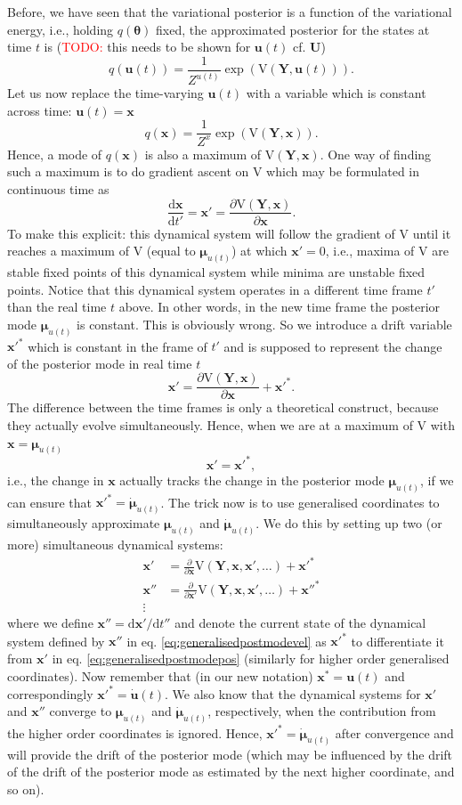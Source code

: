 \documentclass[a4paper,10pt]{article}
\newcommand{\todo}{\textcolor{red}{TODO: }}
\newcommand{\bs}[1]{\mathbf{#1}}					%
\newcommand{\bgs}[1]{\boldsymbol{#1}}				%
\newcommand{\ud}{\mathrm{d}}					%
\newcommand{\pd}[2]{\frac{\partial #1}{\partial #2}} 	%
\newcommand{\eq}[1]{\begin{equation} #1 \end{equation}}%
\renewcommand{\ss}{u}         %
\newcommand{\sh}{x}         %
\newcommand{\spm}{\mu}    %
\renewcommand{\sp}{\theta}    %
\newcommand{\ps}{\bs{\ss}}    %
\newcommand{\ph}{\bs{\sh}}    %
\newcommand{\ppm}{\bgs{\spm}}   %
\newcommand{\pp}{\bgs{\sp}} %
\newcommand{\Ps}{\bs{U}}    %
\newcommand{\Po}{\bs{Y}}    %
\newcommand{\V}{\mathrm{V}}			%
\begin{document}
Before, we have seen that the variational posterior is a function of the variational energy, i.e., holding $q(\pp)$ fixed, the approximated posterior for the states at time $t$ is (\todo this needs to be shown for $\ps(t)$ cf. $\Ps$)
\eq{
    q(\ps(t)) = \frac{1}{Z^{\ss(t)}}\exp\left(\V(\Po,\ps(t)) \right).
}
Let us now replace the time-varying $\ps(t)$ with a variable which is constant across time: $\ps(t)=\ph$
\eq{
    q(\ph) = \frac{1}{Z^{\sh}}\exp\left(\V(\Po,\ph) \right).
}
Hence, a mode of $q(\ph)$ is also a maximum of $\V(\Po,\ph)$. One way of finding such a maximum is to do gradient ascent on $\V$ which may be formulated in continuous time as
\eq{\label{eq:dynGradientAscent}
    \frac{\ud \ph}{\ud t'} = \ph' = \pd{\V(\Po,\ph)}{\ph}.
}
To make this explicit: this dynamical system will follow the gradient of $\V$ until it reaches a maximum of $\V$ (equal to $\ppm_{\ss(t)}$) at which $\ph'=0$, i.e., maxima of $\V$ are stable fixed points of this dynamical system while minima are unstable fixed points. Notice that this dynamical system operates in a different time frame $t'$ than the real time $t$ above. In other words, in the new time frame the posterior mode $\ppm_{\ss(t)}$ is constant. This is obviously wrong. So we introduce a drift variable $\ph'^*$ which is constant in the frame of $t'$ and is supposed to represent the change of the posterior mode in real time $t$
\eq{
    \ph' = \pd{\V(\Po,\ph)}{\ph} + \ph'^*.
}
The difference between the time frames is only a theoretical construct, because they actually evolve simultaneously. Hence, when we are at a maximum of $\V$ with $\ph=\ppm_{\ss(t)}$
\eq{
    \ph' = \ph'^*,
}
i.e., the change in $\ph$ actually tracks the change in the posterior mode $\ppm_{\ss(t)}$, if we can ensure that $\ph'^* = \dot{\ppm}_{\ss(t)}$. The trick now is to use generalised coordinates to simultaneously approximate $\ppm_{\ss(t)}$ and $\dot{\ppm}_{\ss(t)}$. We do this by setting up two (or more) simultaneous dynamical systems:
\begin{align}
    \label{eq:generalisedpostmodepos} \ph' &= \pd{}{\ph}\V(\Po,\ph,\ph',\dots) + \ph'^*\\
    \label{eq:generalisedpostmodevel} \ph'' &= \pd{}{\ph'}\V(\Po,\ph,\ph',\dots) + \ph''^*\\
    \vdots \nonumber
\end{align}
where we define $\ph'' = \ud \ph' / \ud t''$ and denote the current state of the dynamical system defined by $\ph''$ in eq. \eqref{eq:generalisedpostmodevel} as $\ph'^*$ to differentiate it from $\ph'$ in eq. \eqref{eq:generalisedpostmodepos} (similarly for higher order generalised coordinates). Now remember that (in our new notation) $\ph^* = \ps(t)$ and correspondingly $\ph'^* = \dot{\ps}(t)$. We also know that the dynamical systems for $\ph'$ and $\ph''$ converge to $\ppm_{\ss(t)}$ and $\dot{\ppm}_{\ss(t)}$, respectively, when the contribution from the higher order coordinates is ignored. Hence, $\ph'^* = \dot{\ppm}_{\ss(t)}$ after convergence and will provide the drift of the posterior mode (which may be influenced by the drift of the drift of the posterior mode as estimated by the next higher coordinate, and so on). 
\end{document}

